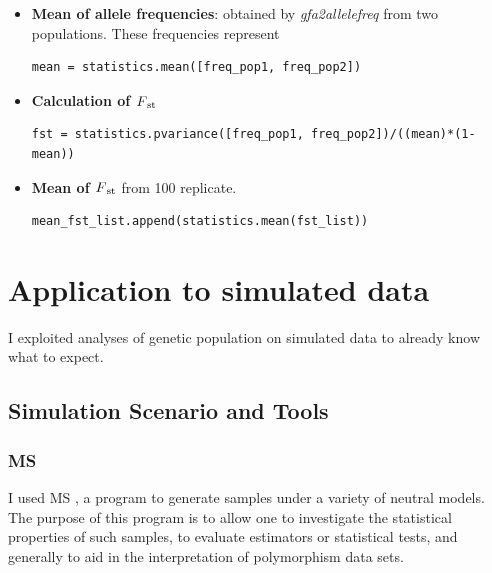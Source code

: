 \begin{itemize}
\item\textbf{Mean of  allele frequencies}:  obtained by \textit{gfa2allelefreq} from two populations. These frequencies represent 
\begin{verbatim}
mean = statistics.mean([freq_pop1, freq_pop2])
\end{verbatim}
 
\item\textbf{Calculation of $F\textsubscript{st}$}

\begin{verbatim}
fst = statistics.pvariance([freq_pop1, freq_pop2])/((mean)*(1-mean))
\end{verbatim}
\item\textbf {Mean of $F\textsubscript{st}$} from 100 replicate. 

\begin{verbatim}
mean_fst_list.append(statistics.mean(fst_list))
\end{verbatim}
\end{itemize}




\vspace{8cm}



\section{Application to simulated data}
I exploited analyses of genetic population on simulated data to already know what to expect.



\subsection{Simulation Scenario and Tools}

\subsubsection{MS}

I used MS \cite{hudson2004ms}, a program to generate samples under a variety of neutral models. The purpose of this program is to allow one to investigate the statistical properties of such samples, to evaluate estimators or statistical tests, and generally to aid in the interpretation of polymorphism data sets.

